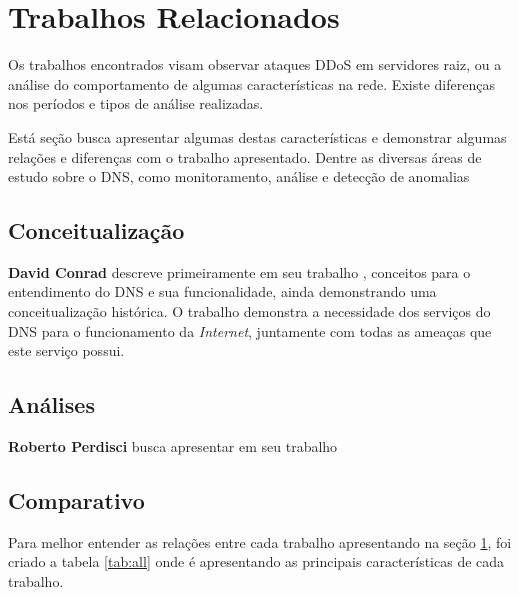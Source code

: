 \chapter{Trabalhos Relacionados}
\label{ch:relacionados}

Os trabalhos encontrados visam observar ataques DDoS em servidores raiz, ou a análise do comportamento de algumas características na rede. Existe diferenças nos períodos e tipos de análise realizadas.
 
Está seção busca apresentar algumas destas características e demonstrar algumas relações e diferenças com o trabalho apresentado. Dentre as diversas áreas de estudo sobre o DNS, como monitoramento, análise e detecção de anomalias



\section{Conceitualização}

\textbf{David Conrad} descreve primeiramente em seu trabalho \cite{Conrad:2012:tidssr}, conceitos para o entendimento do DNS e sua funcionalidade, ainda demonstrando uma conceitualização histórica. O trabalho demonstra a necessidade dos serviços do DNS para o funcionamento da \textit{Internet}, juntamente com todas as ameaças que este serviço possui.


\section{Análises}

\textbf{Roberto Perdisci} busca apresentar em seu trabalho \cite{DBLP:conf/acsac/PerdisciCDL09}


\section{Comparativo}

Para melhor entender as relações entre cada trabalho apresentando na seção \ref{ch:relacionados}, foi criado a tabela \ref{tab:all} onde é apresentando as principais características de cada trabalho.




    




